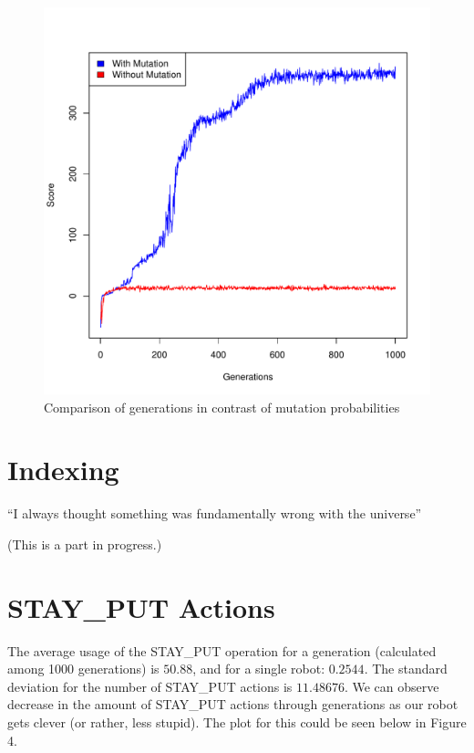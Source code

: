 \documentclass{article}
\begin{document}
\begin{figure}[h!]
\centering
\includegraphics[scale=0.56]{figure-3.pdf}
\caption{Comparison of generations in contrast of mutation probabilities}
\label{fig:fitness-comparison}
\end{figure}

\clearpage

\section{Indexing}
``I always thought something was fundamentally wrong with the universe'' \citep{adams1995hitchhiker}


\textcolor{light-gray}{(This is a part in progress.)}


\section{STAY\_PUT Actions}
The average usage of the STAY\_PUT operation for a generation (calculated among 1000 generations) is $50.88$, and for a single robot: $0.2544$. The standard deviation for the number of STAY\_PUT actions is $11.48676$. We can observe decrease in the amount of STAY\_PUT actions through generations as our robot gets clever (or rather, less stupid). The plot for this could be seen below in Figure 4.
\end{document}
